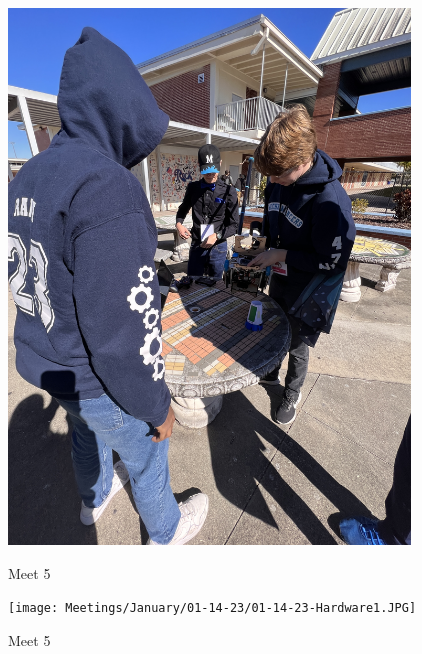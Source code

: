  

\begin{figure}[ht]
\centering
\begin{minipage}[b]{.48\textwidth}
  \centering
  \includegraphics[width=0.95\textwidth]{Meetings/January/01-14-23/01-14-23-Hardware.JPG}
  \caption{Meet 5}
  \label{fig:pic1}
\end{minipage}%
\hfill%
\begin{minipage}[b]{.48\textwidth}
  \centering
  \texttt{[image: Meetings/January/01-14-23/01-14-23-Hardware1.JPG]}
  \caption{Meet 5}
  \label{fig:pic2}
\end{minipage}
\end{figure}


